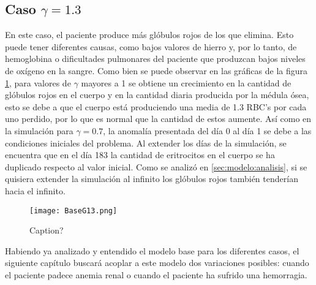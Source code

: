 \subsection{Caso $\gamma=1.3$}\label{subsec:modelo:simulaciones:G13}

En este caso, el paciente produce más glóbulos rojos de los que elimina. Esto puede tener diferentes causas, como bajos valores de hierro y, por lo tanto, de hemoglobina o dificultades pulmonares del paciente que produzcan bajos niveles de oxígeno en la sangre. Como bien se puede observar en las gráficas de la figura \ref{sec:modelo:fig:G13}, para valores de $\gamma$ mayores a 1 se obtiene un crecimiento en la cantidad de glóbulos rojos en el cuerpo y en la cantidad diaria producida por la médula ósea, esto se debe a que el cuerpo está produciendo una media de 1.3 RBC's por cada uno perdido, por lo que es normal que la cantidad de estos aumente. Así como en la simulación para $\gamma = 0.7$, la anomalía presentada del día 0 al día 1 se debe a las condiciones iniciales del problema. Al extender los días de la simulación, se encuentra que en el día 183 la cantidad de eritrocitos en el cuerpo se ha duplicado respecto al valor inicial. Como se analizó en \ref{sec:modelo:analisis}, si se quisiera extender la simulación al infinito los glóbulos rojos también tenderían hacia el infinito. 

\begin{figure}[H]
    \centering
    \texttt{[image: BaseG13.png]}
    \caption{Caption?}
    \label{sec:modelo:fig:G13}
\end{figure}
Habiendo ya analizado y entendido el modelo base para los diferentes casos, el siguiente capítulo buscará acoplar a este modelo dos variaciones posibles: cuando el paciente padece anemia renal o cuando el paciente ha sufrido una hemorragia.
